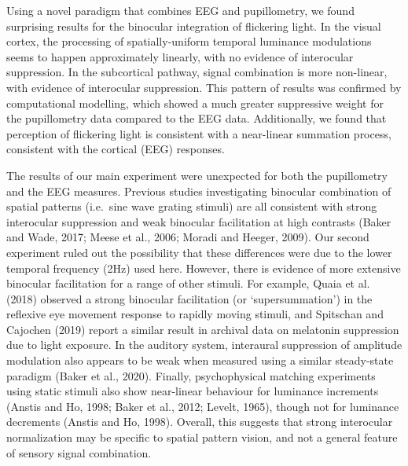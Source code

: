 \documentclass[
]{article}
\begin{document}
Using a novel paradigm that combines EEG and pupillometry, we found surprising results for the binocular integration of flickering light. In the visual cortex, the processing of spatially-uniform temporal luminance modulations seems to happen approximately linearly, with no evidence of interocular suppression. In the subcortical pathway, signal combination is more non-linear, with evidence of interocular suppression. This pattern of results was confirmed by computational modelling, which showed a much greater suppressive weight for the pupillometry data compared to the EEG data. Additionally, we found that perception of flickering light is consistent with a near-linear summation process, consistent with the cortical (EEG) responses.

The results of our main experiment were unexpected for both the pupillometry and the EEG measures. Previous studies investigating binocular combination of spatial patterns (i.e.~sine wave grating stimuli) are all consistent with strong interocular suppression and weak binocular facilitation at high contrasts (Baker and Wade, 2017; Meese et al., 2006; Moradi and Heeger, 2009). Our second experiment ruled out the possibility that these differences were due to the lower temporal frequency (2Hz) used here. However, there is evidence of more extensive binocular facilitation for a range of other stimuli. For example, Quaia et al. (2018) observed a strong binocular facilitation (or `supersummation') in the reflexive eye movement response to rapidly moving stimuli, and Spitschan and Cajochen (2019) report a similar result in archival data on melatonin suppression due to light exposure. In the auditory system, interaural suppression of amplitude modulation also appears to be weak when measured using a similar steady-state paradigm (Baker et al., 2020). Finally, psychophysical matching experiments using static stimuli also show near-linear behaviour for luminance increments (Anstis and Ho, 1998; Baker et al., 2012; Levelt, 1965), though not for luminance decrements (Anstis and Ho, 1998). Overall, this suggests that strong interocular normalization may be specific to spatial pattern vision, and not a general feature of sensory signal combination.
\end{document}
